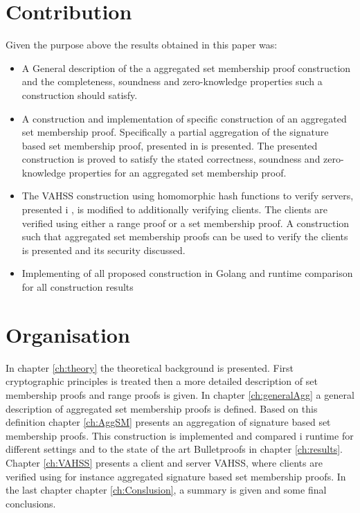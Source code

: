\section*{Contribution}
Given the purpose above the results obtained in this paper was:
\begin{itemize}
\item A General description of the a aggregated set membership proof construction and the completeness, soundness and zero-knowledge properties such a construction should satisfy. 

\item A construction and implementation of specific construction of an aggregated set membership proof. Specifically a partial aggregation of  the signature based set membership proof, presented in \cite{Efficient_proof_interval} is presented. The presented construction is proved to satisfy the stated  correctness, soundness and zero-knowledge  properties for an aggregated set membership proof.

\item The VAHSS construction using homomorphic hash functions to verify servers, presented i \cite{SumItUp}, is modified to additionally verifying clients. The clients are verified using either a range proof or a set membership proof. A construction such that aggregated set membership proofs can be used to verify the clients is presented and its security discussed. 
\item Implementing of all proposed construction in Golang and runtime  comparison for all construction results
\end{itemize}

\section*{Organisation}
In chapter \ref{ch:theory} the theoretical background is presented. First cryptographic principles is treated then a more detailed description of set membership proofs and range proofs is given. In chapter \ref{ch:generalAgg} a general description of aggregated set membership proofs is defined. Based on this definition chapter \ref{ch:AggSM} presents an aggregation of signature based set membership proofs. This construction is implemented and compared i runtime for different settings and to the state of the art Bulletproofs in chapter \ref{ch:results}. Chapter \ref{ch:VAHSS} presents a client and server VAHSS, where clients are verified using for instance aggregated signature based set membership proofs. In the last chapter chapter  \ref{ch:Conslusion},  a summary is given and some final conclusions. 

